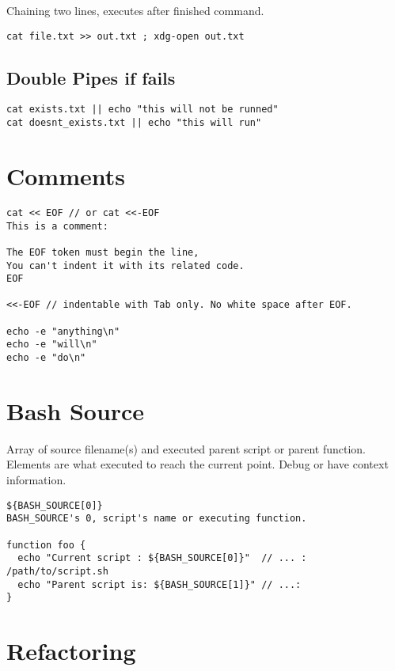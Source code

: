 Chaining two lines, executes after finished command.

\begin{verbatim}
cat file.txt >> out.txt ; xdg-open out.txt 
\end{verbatim}

\subsection{Double Pipes if fails}

\begin{verbatim}
cat exists.txt || echo "this will not be runned" 
cat doesnt_exists.txt || echo "this will run" 
\end{verbatim}

\section{Comments}

\begin{verbatim}
cat << EOF // or cat <<-EOF
This is a comment:

The EOF token must begin the line,
You can't indent it with its related code. 
EOF

<<-EOF // indentable with Tab only. No white space after EOF.

echo -e "anything\n"
echo -e "will\n"
echo -e "do\n"
\end{verbatim}

\section{Bash Source}

Array of source filename(s) and executed parent script or parent function.
Elements are what executed to reach the current point.
Debug or have context information.

\begin{verbatim}
${BASH_SOURCE[0]}
BASH_SOURCE's 0, script's name or executing function.

function foo {
  echo "Current script : ${BASH_SOURCE[0]}"  // ... : /path/to/script.sh
  echo "Parent script is: ${BASH_SOURCE[1]}" // ...: 
}
\end{verbatim}

\section{Refactoring}

